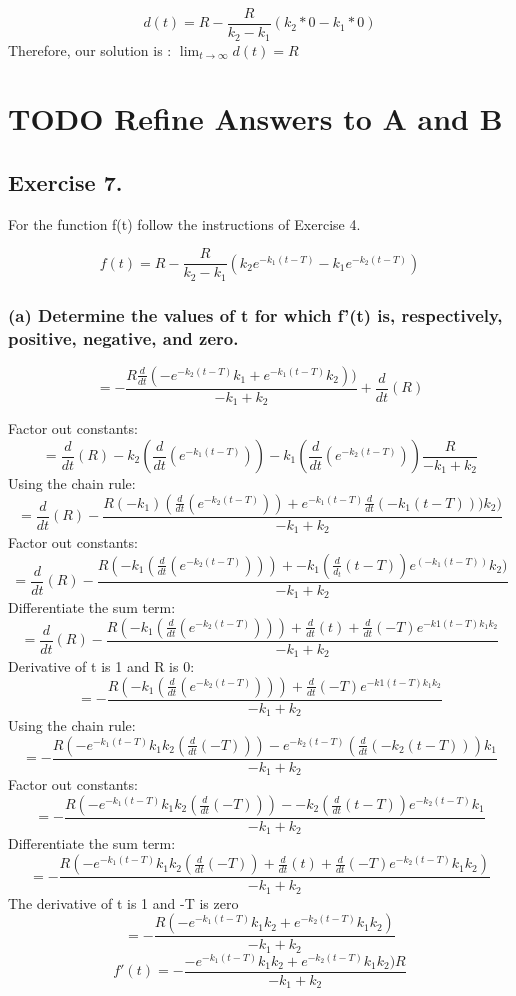 \documentclass[]{article}
\begin{document}
\[d(t) = R - \frac{R}{k_2 - k_1}(k_2*0 - k_1*0)\] Therefore, our
solution is : \(\lim_{t\to\infty}d(t) =R\)

\section{TODO Refine Answers to A and
B}\label{todo-refine-answers-to-a-and-b}

\subsection{Exercise 7.}\label{exercise-7.}

For the function f(t) follow the instructions of Exercise 4.

\[f(t) = R - \frac{R}{k_2 - k_1}(k_2 e^{-k_1(t-T)}-k_1 e^{-k_2(t-T)})\]

\subsubsection{(a) Determine the values of t for which f'(t) is,
respectively, positive, negative, and
zero.}\label{a-determine-the-values-of-t-for-which-ft-is-respectively-positive-negative-and-zero.}

\[=- \frac{R \frac{d}{dt}(-e^{-k_2 (t-T)}k_1 + e^{-k_1(t - T)}k_2))}{-k_1 + k_2} + \frac{d}{dt}(R)\]

Factor out constants:
\[=\frac{d}{dt}(R) - k_2(\frac{d}{dt}(e^{-k_1(t - T)})) - k_1 (\frac{d}{dt}(e^{-k_2(t-T)})) \frac{R}{-k_1 + k_2}\]
Using the chain rule:
\[=\frac{d}{dt}(R)-\frac{R(-k_1)(\frac{d}{dt}(e^{-k_2(t-T)})) + e^{-k_1(t-T)}\frac{d}{dt}(-k_1(t-T)))k_2)}{-k_1+ k_2}\]
Factor out constants:
\[=\frac{d}{dt}(R) - \frac{R(-k_1(\frac{d}{dt}(e^{-k_2(t-T)})))+-k_1(\frac{d}{d_t}(t-T))e^(-k_1(t-T))k_2)}{-k_1 + k_2}\]
Differentiate the sum term:
\[=\frac{d}{dt}(R) - \frac{R(-k_1(\frac{d}{dt}(e^{-k_2(t-T)})))+ \frac{d}{dt}(t) + \frac{d}{dt}(-T)e^{-k1(t-T)k_1 k_2}}{-k_1 + k_2}\]
Derivative of t is 1 and R is 0:
\[=- \frac{R(-k_1(\frac{d}{dt}(e^{-k_2(t-T)})))+ \frac{d}{dt}(-T)e^{-k1(t-T)k_1 k_2}}{-k_1 + k_2}\]
Using the chain rule:
\[=-\frac{R(-e^{-k_1 (t-T)}k_1 k_2(\frac{d}{dt}(-T)))- e^{-k_2(t-T)}(\frac{d}{dt}(-k_2(t-T)))k_1}{-k_1 + k_2}\]
Factor out constants:
\[=-\frac{R(-e^{-k_1 (t-T)}k_1 k_2(\frac{d}{dt}(-T)))- -k_2(\frac{d}{dt}(t-T))e^{-k_2 (t-T)}k_1}{-k_1 + k_2}\]
Differentiate the sum term:
\[=-\frac{R(-e^{-k_1(t-T)}k_1 k_2(\frac{d}{dt}(-T)) + \frac{d}{dt}(t)+\frac{d}{dt}(-T)e^{-k_2(t-T)}k_1 k_2)}{-k_1 + k_2}\]
The derivative of t is 1 and -T is zero
\[=-\frac{R(-e^{-k_1(t-T)}k_1 k_2 + e^{-k_2(t-T)}k_1 k_2)}{-k_1 + k_2}\]
\[f'(t)=-\frac{-e^{-k_1 (t -T)}k_1 k_2 + e^{-k_2(t-T)}k_1 k_2)R}{-k_1 + k_2}\]
\end{document}
